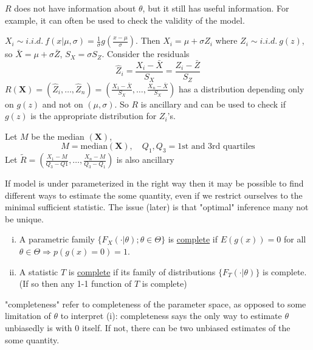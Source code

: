 \documentclass[english, 11pt]{article}
\begin{document}
$R$ does not have information about $\theta$, but it still has useful information. For example, it can often be used to check the validity of the model.


\begin{exmp}\label{exmp:220}
$X_i\sim i.i.d.~f(x|\mu, \sigma)=\frac{1}{\sigma}g\left(\frac{x-\mu}{\sigma}\right)$. Then $X_i=\mu+\sigma Z_i$ where $Z_i\sim i.i.d.~g(z)$, so $\bar{X}=\mu+\sigma \bar{Z}$, $S_X=\sigma S_Z$. Consider the residuals
$$
\hat{Z}_i=\frac{X_i-\bar{X}}{S_X}=\frac{Z_i-\bar{Z}}{S_Z}
$$
$R(\bm{X})=(\hat{Z}_i,\dots, \hat{Z}_n)=\left(\frac{X_1-\bar{X}}{S_X}, \dots, \frac{X_n-\bar{X}}{S_X}\right)$ has a distribution depending only on $g(z)$ and not on $(\mu, \sigma)$. So $R$ is ancillary and can be used to check if $g(z)$ is the appropriate distribution for $Z_i$'s.
\end{exmp}

\begin{note}
Let $M$ be the median $(\bm{X})$, 
$$
M=\text{median}(\bm{X}), \quad Q_1, Q_3=\text{1st and 3rd quartiles}
$$
Let $\tilde{R}=\left(\frac{X_1-M}{Q_3-Q1}, \dots, \frac{X_n-M}{Q_3-Q_1}\right)$ is also ancillary
\end{note}

If model is under parameterized in the right way then it may be possible to find different ways to estimate the some quantity, even if we restrict ourselves to the minimal sufficient statistic. The issue (later) is that "optimal" inference many not be unique.

\begin{defn}\label{defn:221}
\begin{enumerate}[i)]
\item A parametric family $\{F_X(\cdot|\theta);\theta\in\Theta\}$ is \underline{complete} if $E(g(x))=0$ for all $\theta\in\Theta\Rightarrow p(g(x)=0)=1$.
\item A statistic $T$ is \underline{complete} if its family of distributions $\{F_T(\cdot|\theta)\}$ is complete. (If so then any 1-1 function of $T$ is complete)
\end{enumerate}
\end{defn}

"completeness" refer to completeness of the parameter space, as opposed to some limitation of $\theta$ to interpret (i): completeness says the only way to estimate $\theta$ unbiasedly is with 0 itself. If not, there can be two unbiased estimates of the some quantity.
\end{document}
